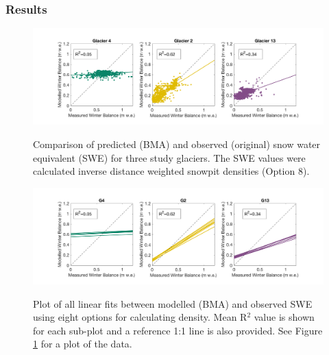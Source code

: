 \documentclass[12pt]{article}
\begin{document}
\subsubsection{Results}

\begin{landscape}
\begin{figure}
	\centering
	\includegraphics[height = 0.5\textwidth]{BMSfit_opt8.png}\\
	\caption{Comparison of predicted (BMA) and observed (original) snow water equivalent (SWE) for three study glaciers. The SWE values were calculated inverse distance weighted snowpit densities (Option 8).}
	\label{fig:BMSfit_opt8}
\end{figure}

\pagebreak

\begin{figure}
	\centering
	\includegraphics[height = 0.4\textwidth]{BMSfit_allLines.png}\\
	\caption{Plot of all linear fits between modelled (BMA) and observed SWE using eight options for calculating density. Mean R$^2$ value is shown for each sub-plot and a reference 1:1 line is also provided. See Figure \ref{fig:BMSfit_opt8} for a plot of the data. }
	\label{fig:BMSfit_allLines}
\end{figure}


\end{landscape}
\end{document}

